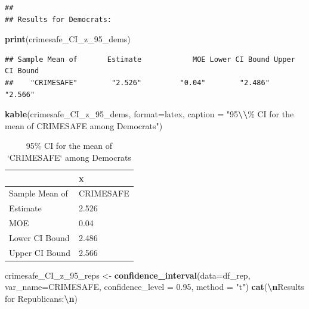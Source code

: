 \documentclass[
  11pt,
]{article}
\newenvironment{Shaded}{\begin{snugshade}}{\end{snugshade}}
\newcommand{\AttributeTok}[1]{\textcolor[rgb]{0.13,0.29,0.53}{#1}}
\newcommand{\FloatTok}[1]{\textcolor[rgb]{0.00,0.00,0.81}{#1}}
\newcommand{\FunctionTok}[1]{\textcolor[rgb]{0.13,0.29,0.53}{\textbf{#1}}}
\newcommand{\NormalTok}[1]{#1}
\newcommand{\OtherTok}[1]{\textcolor[rgb]{0.56,0.35,0.01}{#1}}
\newcommand{\SpecialCharTok}[1]{\textcolor[rgb]{0.81,0.36,0.00}{\textbf{#1}}}
\newcommand{\StringTok}[1]{\textcolor[rgb]{0.31,0.60,0.02}{#1}}
\begin{document}
\begin{verbatim}
##
## Results for Democrats:
\end{verbatim}

\begin{Shaded}
\begin{Highlighting}[]
\FunctionTok{print}\NormalTok{(crimesafe\_CI\_z\_95\_dems)}
\end{Highlighting}
\end{Shaded}

\begin{verbatim}
## Sample Mean of       Estimate            MOE Lower CI Bound Upper CI Bound
##    "CRIMESAFE"        "2.526"         "0.04"        "2.486"        "2.566"
\end{verbatim}

\begin{Shaded}
\begin{Highlighting}[]
\FunctionTok{kable}\NormalTok{(crimesafe\_CI\_z\_95\_dems, }\AttributeTok{format=}\StringTok{\textquotesingle{}latex\textquotesingle{}}\NormalTok{, }\AttributeTok{caption =} \StringTok{"95}\SpecialCharTok{\textbackslash{}\textbackslash{}}\StringTok{\% CI for the mean of \textasciigrave{}CRIMESAFE\textasciigrave{} among Democrats"}\NormalTok{)}
\end{Highlighting}
\end{Shaded}

\begin{table}

\caption{\label{tab:q1-d-part1}95\% CI for the mean of `CRIMESAFE` among Democrats}
\centering
\begin{tabular}[t]{l|l}
\hline
  & x\\
\hline
Sample Mean of & CRIMESAFE\\
\hline
Estimate & 2.526\\
\hline
MOE & 0.04\\
\hline
Lower CI Bound & 2.486\\
\hline
Upper CI Bound & 2.566\\
\hline
\end{tabular}
\end{table}

\begin{Shaded}
\begin{Highlighting}[]
\NormalTok{crimesafe\_CI\_z\_95\_reps }\OtherTok{\textless{}{-}} \FunctionTok{confidence\_interval}\NormalTok{(}\AttributeTok{data=}\NormalTok{df\_rep, }
                                         \AttributeTok{var\_name=}\StringTok{\textquotesingle{}CRIMESAFE\textquotesingle{}}\NormalTok{, }
                                         \AttributeTok{confidence\_level =} \FloatTok{0.95}\NormalTok{, }\AttributeTok{method =} \StringTok{"t"}\NormalTok{)}
\FunctionTok{cat}\NormalTok{(}\StringTok{\textquotesingle{}}\SpecialCharTok{\textbackslash{}n}\StringTok{Results for Republicans:}\SpecialCharTok{\textbackslash{}n}\StringTok{\textquotesingle{}}\NormalTok{)}
\end{Highlighting}
\end{Shaded}
\end{document}
